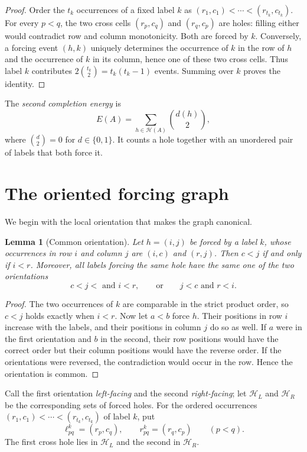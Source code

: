 \documentclass[11pt]{article}
\numberwithin{equation}{section}
\newtheorem{lemma}[theorem]{Lemma}
\theoremstyle{definition}
\theoremstyle{remark}
\newcommand{\Hcal}{\mathcal H}
\begin{document}
\begin{proof}
Order the $t_k$ occurrences of a fixed label $k$ as
$(r_1,c_1)<\cdots<(r_{t_k},c_{t_k})$.  For every $p<q$, the two cross cells
$(r_p,c_q)$ and $(r_q,c_p)$ are holes: filling either would contradict row and
column monotonicity.  Both are forced by $k$.  Conversely, a forcing event
$(h,k)$ uniquely determines the occurrence of $k$ in the row of $h$ and the
occurrence of $k$ in its column, hence one of these two cross cells.  Thus label
$k$ contributes $2\binom{t_k}{2}=t_k(t_k-1)$ events.  Summing over $k$ proves
the identity.
\end{proof}

The \emph{second completion energy} is
\begin{equation}\label{eq:second-energy}
 E(A)=\sum_{h\in\Hcal(A)}\binom{d(h)}2,
\end{equation}
where $\binom d2=0$ for $d\in\{0,1\}$.  It counts a hole together with an
unordered pair of labels that both force it.

\section{The oriented forcing graph}
\label{sec:forcing-graph}

We begin with the local orientation that makes the graph canonical.

\begin{lemma}[Common orientation]\label{lem:common-orientation}
Let $h=(i,j)$ be forced by a label $k$, whose occurrences in row $i$ and
column $j$ are $(i,c)$ and $(r,j)$.  Then $c<j$ if and only if $i<r$.
Moreover, all labels forcing the same hole have the same one of the two
orientations
\[
 c<j<{}\text{ and }i<r,\qquad\text{or}\qquad j<c\text{ and }r<i.
\]
\end{lemma}

\begin{proof}
The two occurrences of $k$ are comparable in the strict product order, so
$c<j$ holds exactly when $i<r$.  Now let $a<b$ force $h$.  Their positions in
row $i$ increase with the labels, and their positions in column $j$ do so as
well.  If $a$ were in the first orientation and $b$ in the second, their row
positions would have the correct order but their column positions would have
the reverse order.  If the orientations were reversed, the contradiction
would occur in the row.  Hence the orientation is common.
\end{proof}

Call the first orientation \emph{left-facing} and the second
\emph{right-facing}; let $\Hcal_L$ and $\Hcal_R$ be the corresponding sets of
forced holes.  For the ordered occurrences
$(r_1,c_1)<\cdots<(r_{t_k},c_{t_k})$ of label $k$, put
\[
 \ell^k_{pq}=(r_p,c_q),\qquad r^k_{pq}=(r_q,c_p)\qquad(p<q).
\]
The first cross hole lies in $\Hcal_L$ and the second in $\Hcal_R$.
\end{document}
